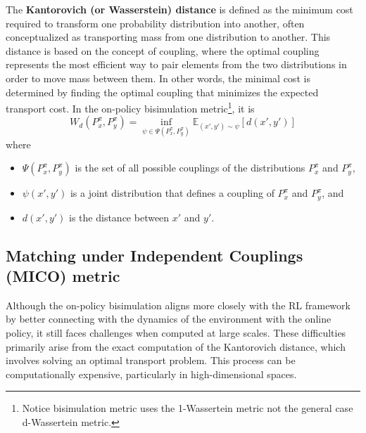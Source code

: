 The \textbf{Kantorovich (or Wasserstein) distance} \cite{villani2009optimal} is defined as the minimum cost required to transform one probability distribution into another, often conceptualized as transporting mass from one distribution to another. This distance is based on the concept of coupling, where the optimal coupling represents the most efficient way to pair elements from the two distributions in order to move mass between them. In other words, the minimal cost is determined by finding the optimal coupling that minimizes the expected transport cost. In the on-policy bisimulation metric\footnote{Notice bisimulation metric uses the 1-Wassertein metric not the general case d-Wassertein metric.}, it is
\begin{equation}
W_d(P_{x}^\pi, P_{y}^\pi) = \inf_{\psi \in \Psi(P_{x}^\pi, P_{y}^\pi)} \mathbb{E}_{(x',y') \sim \psi} \left[ d(x', y') \right]
\end{equation}
where 
\begin{itemize}
    \item $\Psi(P_{x}^\pi, P_{y}^\pi)$ is the set of all possible couplings of the distributions $P_{x}^\pi$ and $P_{y}^\pi$,
    \item $\psi(x',y')$ is a joint distribution that defines a coupling of $P_{x}^\pi$ and $P_{y}^\pi$, and 
    \item $d(x',y')$ is the distance between $x'$ and $y'$.
\end{itemize}

\subsection{Matching under Independent Couplings (MICO) metric}

Although the on-policy bisimulation aligns more closely with the RL framework by better connecting with the dynamics of the environment with the online policy, it still faces challenges when computed at large scales. These difficulties primarily arise from the exact computation of the Kantorovich distance, which involves solving an optimal transport problem. This process can be computationally expensive, particularly in high-dimensional spaces.

